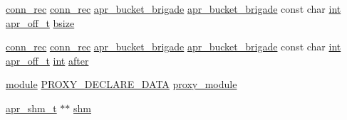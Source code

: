 \begin{DoxyCompactItemize}
\item 
\hyperlink{structconn__rec}{conn\+\_\+rec} \hyperlink{structconn__rec}{conn\+\_\+rec} \hyperlink{structapr__bucket__brigade}{apr\+\_\+bucket\+\_\+brigade} \hyperlink{structapr__bucket__brigade}{apr\+\_\+bucket\+\_\+brigade} const char \hyperlink{pcre_8txt_a42dfa4ff673c82d8efe7144098fbc198}{int} \hyperlink{group__apr__platform_ga6938af9075cec15c88299109381aa984}{apr\+\_\+off\+\_\+t} \hyperlink{group__MOD__PROXY_ga99aa71807e3d8959b13eb4684c9d1ee9}{bsize}
\item 
\hyperlink{structconn__rec}{conn\+\_\+rec} \hyperlink{structconn__rec}{conn\+\_\+rec} \hyperlink{structapr__bucket__brigade}{apr\+\_\+bucket\+\_\+brigade} \hyperlink{structapr__bucket__brigade}{apr\+\_\+bucket\+\_\+brigade} const char \hyperlink{pcre_8txt_a42dfa4ff673c82d8efe7144098fbc198}{int} \hyperlink{group__apr__platform_ga6938af9075cec15c88299109381aa984}{apr\+\_\+off\+\_\+t} \hyperlink{pcre_8txt_a42dfa4ff673c82d8efe7144098fbc198}{int} \hyperlink{group__MOD__PROXY_gabe5742ecd24263fc01da937ad820d3fa}{after}
\item 
\hyperlink{group__APACHE__CORE__CONFIG_ga0ea4f633a5f9f88e1603aaeb1f2b2e69}{module} \hyperlink{group__MOD__PROXY_ga0446e2d44d50898071a7dcb4fd9172b0}{P\+R\+O\+X\+Y\+\_\+\+D\+E\+C\+L\+A\+R\+E\+\_\+\+D\+A\+TA} \hyperlink{group__MOD__PROXY_ga27b03f85d7a77ee10f73b8df6f58aa0e}{proxy\+\_\+module}
\item 
\hyperlink{structapr__shm__t}{apr\+\_\+shm\+\_\+t} $\ast$$\ast$ \hyperlink{group__MOD__PROXY_gaa4ebe098e8dd67428afcaa1f9bca45bd}{shm}
\item 
$$
\end{DoxyCompactItemize}
